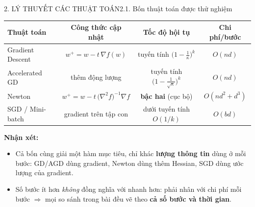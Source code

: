 \documentclass[aspectratio=169,11pt]{beamer}
\newcommand{\nx}{\textbf{Nhận xét:}}
\begin{document}
\begin{frame}{2. LÝ THUYẾT CÁC THUẬT TOÁN}{2.1. Bốn thuật toán được thử nghiệm}
  \label{sec:2}%
  \small
  \begin{center}
  \begin{tabular}{lccc}
    \toprule
    Thuật toán & Công thức cập nhật & Tốc độ hội tụ & Chi phí/bước\\
    \midrule
    Gradient Descent & $w^+=w-t\,\nabla f(w)$ & tuyến tính $\big(1-\tfrac1\kappa\big)^k$ & $O(nd)$\\
    Accelerated GD & thêm động lượng & tuyến tính $\big(1-\tfrac{1}{\sqrt\kappa}\big)^k$ & $O(nd)$\\
    Newton & $w^+=w-t\,\big(\nabla^2f\big)^{-1}\nabla f$ & \textbf{bậc hai} (cục bộ) & $O(nd^2{+}d^3)$\\
    SGD / Mini-batch & gradient trên tập con & dưới tuyến tính $O(1/k)$ & $O(bd)$\\
    \bottomrule
  \end{tabular}
  \end{center}
  \vspace{6pt}
  \nx{}
  \begin{itemize}
    \item Cả bốn cùng giải một hàm mục tiêu, chỉ khác \textbf{lượng thông tin} dùng ở mỗi bước:
          GD/AGD dùng gradient, Newton dùng thêm Hessian, SGD dùng ước lượng của gradient.
    \item Số bước ít hơn \emph{không} đồng nghĩa với nhanh hơn: phải nhân với chi phí mỗi bước
          $\Rightarrow$ mọi so sánh trong bài đều vẽ theo \textbf{cả số bước và thời gian}.
  \end{itemize}
\end{frame}
\end{document}
